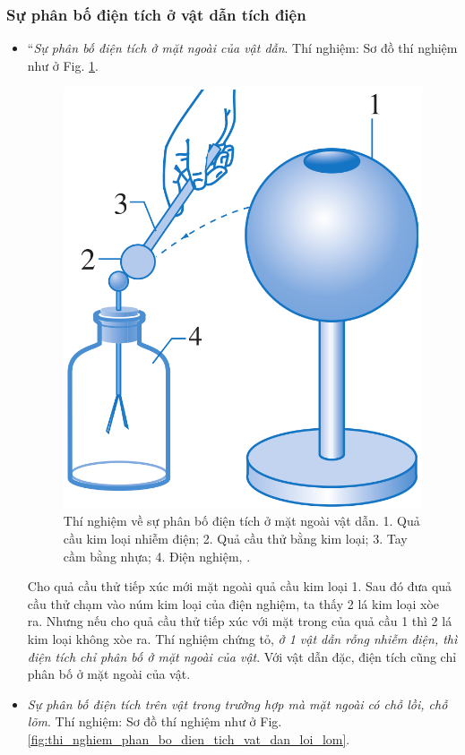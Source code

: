 \documentclass[oneside]{book}
\numberwithin{equation}{section}
\begin{document}
\subsubsection{Sự phân bố điện tích ở vật dẫn tích điện}
\begin{itemize}
	\item ``\textit{Sự phân bố điện tích ở mặt ngoài của vật dẫn}. Thí nghiệm: Sơ đồ thí nghiệm như ở Fig. \ref{fig:thi_nghiem_phan_bo_dien_tich_mat_ngoai_vat_dan}.
	
	\begin{figure}[H]
		\centering
		\includegraphics[scale=0.15]{thi_nghiem_phan_bo_dien_tich_mat_ngoai_vat_dan}
		\caption{Thí nghiệm về sự phân bố điện tích ở mặt ngoài vật dẫn. 1. Quả cầu kim loại nhiễm điện; 2. Quả cầu thử bằng kim loại; 3. Tay cầm bằng nhựa; 4. Điện nghiệm, \cite[Hình 6.3, p. 29]{SGK_Vat_Ly_11_nang_cao}.}
		\label{fig:thi_nghiem_phan_bo_dien_tich_mat_ngoai_vat_dan}
	\end{figure}
	Cho quả cầu thử tiếp xúc mới mặt ngoài quả cầu kim loại 1. Sau đó đưa quả cầu thử chạm vào núm kim loại của điện nghiệm, ta thấy 2 lá kim loại xòe ra. Nhưng nếu cho quả cầu thử tiếp xúc với mặt trong của quả cầu 1 thì 2 lá kim loại không xòe ra. Thí nghiệm chứng tỏ, \textit{ở 1 vật dẫn rỗng nhiễm điện, thì điện tích chỉ phân bố ở mặt ngoài của vật}. Với vật dẫn đặc, điện tích cũng chỉ phân bố ở mặt ngoài của vật.
	\item \textit{Sự phân bố điện tích trên vật trong trường hợp mà mặt ngoài có chỗ lồi, chỗ lõm}. Thí nghiệm: Sơ đồ thí nghiệm như ở Fig. \ref{fig:thi_nghiem_phan_bo_dien_tich_vat_dan_loi_lom}.
	

\end{itemize}
\end{document}
